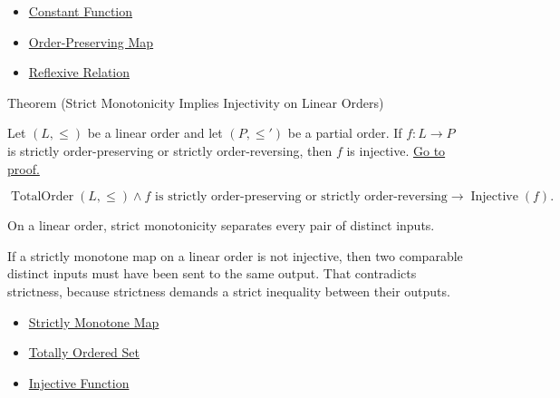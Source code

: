 \begin{dependencies}
\begin{itemize}
  \item \hyperref[def:constant]{Constant Function}
  \item \hyperref[def:order-preserving-map-ordered-sets]{Order-Preserving Map}
  \item \hyperref[def:reflexive]{Reflexive Relation}
\end{itemize}
\end{dependencies}

\begin{theorembox}{Theorem (Strict Monotonicity Implies Injectivity on Linear Orders)}
\begin{theorem}\label{thm:strict-monotone-injective-linear}
Let $(L,\leq)$ be a linear order and let $(P,\leq')$ be a partial order.
If $f:L\to P$ is strictly order-preserving or strictly order-reversing, then
$f$ is injective.
\hyperref[prf:strict-monotone-injective-linear]{Go to proof.}
\end{theorem}
\end{theorembox}

\begin{remark*}
\[
  \operatorname{TotalOrder}(L,\leq)
  \wedge
  f\text{ is strictly order-preserving or strictly order-reversing}
  \to
  \operatorname{Injective}(f).
\]
\end{remark*}

\begin{remark*}[Interpretation]
On a linear order, strict monotonicity separates every pair of distinct inputs.
\end{remark*}

\begin{remark*}[Exposition]
If a strictly monotone map on a linear order is not injective, then two
comparable distinct inputs must have been sent to the same output. That
contradicts strictness, because strictness demands a strict inequality between
their outputs.
\end{remark*}

\begin{dependencies}
\begin{itemize}
  \item \hyperref[def:strictly-monotone-map-functions-order]{Strictly Monotone Map}
  \item \hyperref[def:totally-ordered-set]{Totally Ordered Set}
  \item \hyperref[def:injective]{Injective Function}
\end{itemize}
\end{dependencies}


